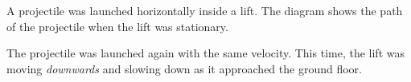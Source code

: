 \begin{quizq}{}
A projectile was launched horizontally inside a lift. The diagram shows the path of the
projectile when the lift was stationary.
\begin{center}
\end{center}
The projectile was launched again with the same velocity. This time, the lift was moving
\emph{downwards} and slowing down as it approached the ground floor.


\end{quizq}
